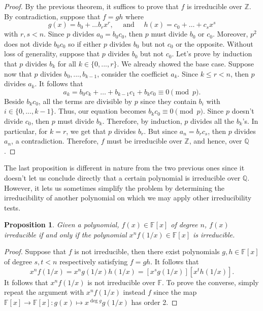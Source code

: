 \documentclass{article}
\theoremstyle{plain}
\newtheorem{proposition}[theorem]{Proposition}
\theoremstyle{definition}
\newcommand{\Q}{\mathbb{Q}}
\newcommand{\Z}{\mathbb{Z}}
\newcommand{\F}{\mathbb{F}}
\begin{document}
\begin{proof}
    By the previous theorem, it suffices to prove that $f$ is irreducible over $\Z$. By contradiction, suppose that $f = gh$ where 
    $$g(x) = b_0 + \dots b_r x^r, \quad \text{ and } \quad h(x) = c_0 + \dots + c_s x^s$$
    with $r,s < n$. Since $p$ divides $a_0 = b_0 c_0$, then $p$ must divide $b_0$ or $c_0$. Moreover, $p^2$ does not divide $b_0 c_0$ so if either $p$ divides $b_0$ but not $c_0$ or the opposite. Without loss of generality, suppose that $p$ divides $b_0$ but not $c_0$. Let's prove by induction that $p$ divides $b_k$ for all $k \in \{0, ..., r\}$. We already showed the base case. Suppose now that $p$ divides $b_0, ..., b_{k-1}$, consider the coefficiet $a_k$. Since $k \leq r < n$, then $p$ divides $a_k$. It follows that
    $$a_k = b_0 c_k + \dots + b_{k-1}c_1 + b_k c_0 \equiv 0 \pmod p.$$
    Beside $b_k c_0$, all the terms are divisible by $p$ since they contain $b_i$ with $i \in \{0, ..., k-1\}$. Thus, our equation becomes $b_k c_0 \equiv 0 \pmod p$. Since $p$ doesn't divide $c_0$, then $p$ must divide $b_k$. Therefore, by induction, $p$ divides all the $b_k$'s. In particular, for $k = r$, we get that $p$ divides $b_r$. But since $a_n = b_r c_s$, then $p$ divides $a_n$, a contradiction. Therefore, $f$ must be irreducible over $\Z$, and hence, over $\Q$.
\end{proof}

The last proposition is different in nature from the two previous ones since it doesn't let us conclude directly that a certain polynomial is irreducible over $\Q$. However, it lets us sometimes simplify the problem by determining the irreducibility of another polynomial on which we may apply other irreducibility tests.

\begin{proposition}
    Given a polynomial, $f(x) \in \F[x]$ of degree $n$, $f(x)$ irreducible if and only if the polynomial $x^nf(1/x) \in \F[x]$ is irreducible.
\end{proposition}

\begin{proof}
    Suppose that $f$ is not irreducible, then there exist polynomials $g,h \in \F[x]$ of degree $s,t < n$ respectively satisfying $f = gh$. It follows that
    $$x^n f(1/x) = x^n g(1/x)h(1/x) = [x^sg(1/x)][x^t h(1/x)].$$
    It follows that $x^nf(1/x)$ is not irreducible over $\F$. To prove the converse, simply repeat the argument with $x^nf(1/x)$ instead $f$ since the map $\F[x] \to \F[x] : g(x) \mapsto x^{\deg g}g(1/x)$ has order 2. 
\end{proof}
\end{document}
